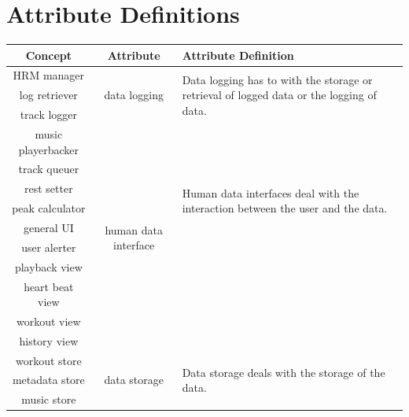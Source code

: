 \documentclass[letterpaper,english, 12pt]{scrreprt}
\begin{document}
    \section{Attribute Definitions}
		\begin{center}
			\renewcommand{\arraystretch}{1.5}
	        \begin{tabular}[h]{| c | c | m{} |}
	            \hline
	            Concept & Attribute & Attribute Definition\\
	            \hline			
	            HRM manager & \multirow{3}{*}{data logging} & \multirow{3}{0.4\textwidth}{Data logging has to with the storage or retrieval of logged data or the logging of data.} \\
				\cline{1-1}
	            log retriever & & \\
				\cline{1-1}
	            track logger & & \\
				\hline
	            music playerbacker & \multirow{10}{*}{human data interface} & \multirow{7}{0.4\textwidth}{Human data interfaces deal with the interaction between the user and the data.}\\
				\cline{1-1}
	            track queuer & &\\
				\cline{1-1}
		    rest setter & &\\
				\cline{1-1}
		    peak calculator & &\\
				\cline{1-1}
	            general UI & &\\
				\cline{1-1}
		    user alerter & &\\
				\cline{1-1}
	            playback view &&\\
				\cline{1-1}
	            heart beat view & &\\
				\cline{1-1}
	            workout view & & \\
				\cline{1-1}
	            history view & &\\
				\hline
	            workout store & \multirow{3}{*}{data storage} & \multirow{3}{0.4\textwidth}{Data storage deals with the storage of the data.}\\
				\cline{1-1}
	            metadata store & &\\
				\cline{1-1}
	            music store & &\\
	            \hline
	        \end{tabular}
		\end{center}
\end{document}
